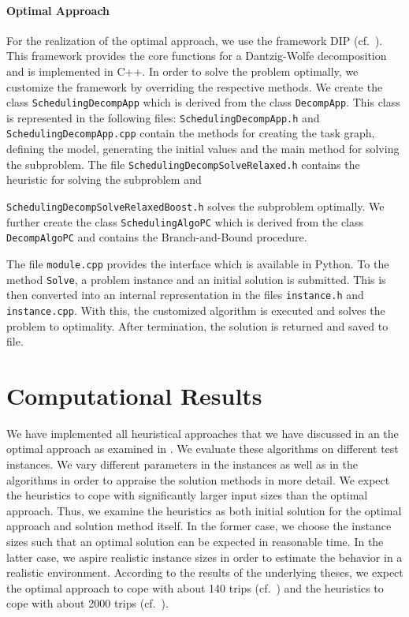 \paragraph{Optimal Approach} \parfill

For the realization of the optimal approach, we use the framework DIP (cf.~\cite{DIP}). This framework provides the core functions for a Dantzig-Wolfe decomposition and is implemented in C++. In order to solve the problem optimally, we customize the framework by overriding the respective methods. We create the class \texttt{SchedulingDecompApp} which is derived from the class \texttt{DecompApp}. This class is represented in the following files: \texttt{SchedulingDecompApp.h} and \texttt{SchedulingDecompApp.cpp} contain the methods for creating the task graph, defining the model, generating the initial values and the main method for solving the subproblem. The file \texttt{SchedulingDecompSolveRelaxed.h} contains the heuristic for solving the subproblem and\par
\texttt{SchedulingDecompSolveRelaxedBoost.h} solves the subproblem optimally. We further create the class \texttt{SchedulingAlgoPC} which is derived from the class \texttt{DecompAlgoPC} and contains the Branch-and-Bound procedure.

The file \texttt{module.cpp} provides the interface which is available in Python. To the method \texttt{Solve}, a problem instance and an initial solution is submitted. This is then converted into an internal representation in the files \texttt{instance.h} and \texttt{instance.cpp}. With this, the customized algorithm is executed and solves the problem to optimality. After termination, the solution is returned and saved to file.


\section{Computational Results}
\label{sec:computational_results}

We have implemented all heuristical approaches that we have discussed in  an the optimal approach as examined in . We evaluate these algorithms on different test instances. We vary different parameters in the instances as well as in the algorithms in order to appraise the solution methods in more detail. We expect the heuristics to cope with significantly larger input sizes than the optimal approach. Thus, we examine the heuristics as both initial solution for the optimal approach and solution method itself. In the former case, we choose the instance sizes such that an optimal solution can be expected in reasonable time. In the latter case, we aspire realistic instance sizes in order to estimate the behavior in a realistic environment. According to the results of the underlying theses, we expect the optimal approach to cope with about 140 trips (cf.~\cite[p.~139]{Kaiser}) and the heuristics to cope with about 2000 trips (cf.~\cite[p.~138]{Knoll}).

